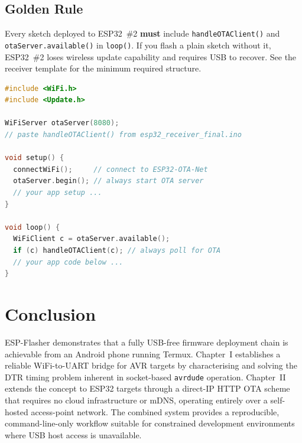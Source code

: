 \documentclass[conference]{IEEEtran}
\begin{document}
\subsection{Golden Rule}

Every sketch deployed to ESP32~\#2 \textbf{must} include
\texttt{handleOTAClient()} and \texttt{otaServer.available()} in
\texttt{loop()}.
If you flash a plain sketch without it, ESP32~\#2 loses wireless update
capability and requires USB to recover.
See the receiver template for the minimum required structure.

\begin{lstlisting}[language=C++, caption={Minimum required structure for every ESP32 \#2 firmware}]
#include <WiFi.h>
#include <Update.h>

WiFiServer otaServer(8080);
// paste handleOTAClient() from esp32_receiver_final.ino

void setup() {
  connectWiFi();     // connect to ESP32-OTA-Net
  otaServer.begin(); // always start OTA server
  // your app setup ...
}

void loop() {
  WiFiClient c = otaServer.available();
  if (c) handleOTAClient(c); // always poll for OTA
  // your app code below ...
}
\end{lstlisting}

\section{Conclusion}

ESP-Flasher demonstrates that a fully USB-free firmware deployment chain is
achievable from an Android phone running Termux.
Chapter~I establishes a reliable WiFi-to-UART bridge for AVR targets by
characterising and solving the DTR timing problem inherent in socket-based
\texttt{avrdude} operation.
Chapter~II extends the concept to ESP32 targets through a direct-IP HTTP OTA
scheme that requires no cloud infrastructure or mDNS, operating entirely over
a self-hosted access-point network.
The combined system provides a reproducible, command-line-only workflow
suitable for constrained development environments where USB host access is
unavailable.



\end{document}
